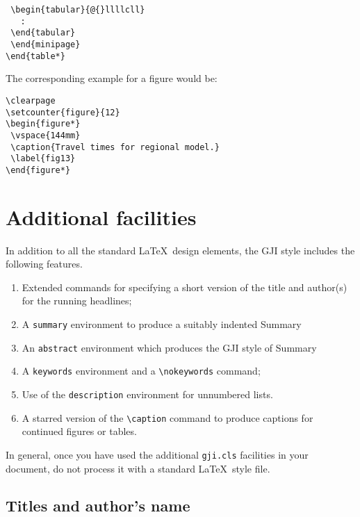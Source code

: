 \documentclass{gji}
\begin{document}
\begin{enumerate}
\begin{verbatim}
 \begin{tabular}{@{}llllcll}
   :
 \end{tabular}
 \end{minipage}
\end{table*}
\end{verbatim}
The corresponding example for a figure would be:
\begin{verbatim}
\clearpage
\setcounter{figure}{12}
\begin{figure*}
 \vspace{144mm}
 \caption{Travel times for regional model.}
 \label{fig13}
\end{figure*}
\end{verbatim}
\end{enumerate}


\section{Additional facilities}

In addition to all the standard \LaTeX\ design elements, the GJI style
includes the following features.
\begin{enumerate}
  \item Extended commands for specifying a short version of the title and
        author(s) for the running headlines;
  \item A \verb"summary" environment to produce a suitably indented
        Summary
  \item An \verb"abstract" environment which produces the GJI style of
        Summary
  \item A \verb"keywords" environment and a \verb"\nokeywords" command;
  \item Use of the \verb"description" environment for unnumbered lists.
  \item A starred version of the \verb"\caption" command to produce
        captions for continued figures or tables.
 \end{enumerate}
 In general, once you have used the additional \verb"gji.cls" facilities
in your document, do not process it with a standard \LaTeX\ style file.

\subsection{Titles and author's name}
\end{document}
